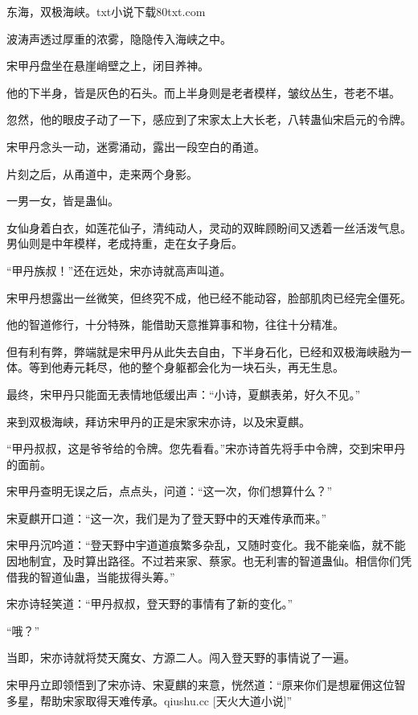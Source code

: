 
\begin{this_body}

东海，双极海峡。txt小说下载80txt.com

波涛声透过厚重的浓雾，隐隐传入海峡之中。

宋甲丹盘坐在悬崖峭壁之上，闭目养神。

他的下半身，皆是灰色的石头。而上半身则是老者模样，皱纹丛生，苍老不堪。

忽然，他的眼皮子动了一下，感应到了宋家太上大长老，八转蛊仙宋启元的令牌。

宋甲丹念头一动，迷雾涌动，露出一段空白的甬道。

片刻之后，从甬道中，走来两个身影。

一男一女，皆是蛊仙。

女仙身着白衣，如莲花仙子，清纯动人，灵动的双眸顾盼间又透着一丝活泼气息。男仙则是中年模样，老成持重，走在女子身后。

“甲丹族叔！”还在远处，宋亦诗就高声叫道。

宋甲丹想露出一丝微笑，但终究不成，他已经不能动容，脸部肌肉已经完全僵死。

他的智道修行，十分特殊，能借助天意推算事和物，往往十分精准。

但有利有弊，弊端就是宋甲丹从此失去自由，下半身石化，已经和双极海峡融为一体。等到他寿元耗尽，他的整个身躯都会化为一块石头，再无生息。

最终，宋甲丹只能面无表情地低缓出声：“小诗，夏麒表弟，好久不见。”

来到双极海峡，拜访宋甲丹的正是宋家宋亦诗，以及宋夏麒。

“甲丹叔叔，这是爷爷给的令牌。您先看看。”宋亦诗首先将手中令牌，交到宋甲丹的面前。

宋甲丹查明无误之后，点点头，问道：“这一次，你们想算什么？”

宋夏麒开口道：“这一次，我们是为了登天野中的天难传承而来。”

宋甲丹沉吟道：“登天野中宇道道痕繁多杂乱，又随时变化。我不能亲临，就不能因地制宜，及时算出路径。不过若来家、蔡家。也无利害的智道蛊仙。相信你们凭借我的智道仙蛊，当能拔得头筹。”

宋亦诗轻笑道：“甲丹叔叔，登天野的事情有了新的变化。”

“哦？”

当即，宋亦诗就将焚天魔女、方源二人。闯入登天野的事情说了一遍。

宋甲丹立即领悟到了宋亦诗、宋夏麒的来意，恍然道：“原来你们是想雇佣这位智多星，帮助宋家取得天难传承。qiushu.cc [天火大道小说]”


\end{this_body}
